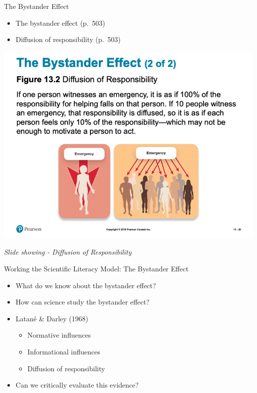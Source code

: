 \documentclass[
]{book}
\providecommand{\tightlist}{%
  \setlength{\itemsep}{0pt}\setlength{\parskip}{0pt}}
\begin{document}
\begin{reflect}
The Bystander Effect

\begin{itemize}
\tightlist
\item
  The bystander effect (p.~503)\\
\item
  Diffusion of responsibility (p.~503)
\end{itemize}

\includegraphics{assets/unit_6/slide_20.png}

\emph{Slide showing - Diffusion of Responsibility}

Working the Scientific Literacy Model: The Bystander Effect

\begin{itemize}
\tightlist
\item
  What do we know about the bystander effect?\\
\item
  How can science study the bystander effect?\\
\item
  Latané \& Darley (1968)

  \begin{itemize}
  \tightlist
  \item
    Normative influences\\
  \item
    Informational influences\\
  \item
    Diffusion of responsibility\\
  \end{itemize}
\item
  Can we critically evaluate this evidence?


\end{itemize}
\end{reflect}
\end{document}
